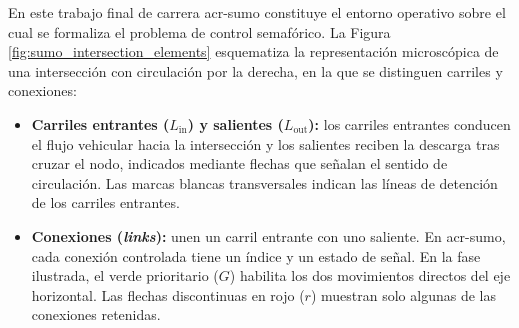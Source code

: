 En este trabajo final de carrera \acrshort{acr-sumo} constituye el entorno operativo sobre el cual se formaliza el problema de control semafórico. La Figura \ref{fig:sumo_intersection_elements} esquematiza la representación microscópica de una intersección con circulación por la derecha, en la que se distinguen carriles y conexiones:
\begin{itemize}
    \item \textbf{Carriles entrantes ($L_{\text{in}}$) y salientes ($L_{\text{out}}$):} los carriles entrantes conducen el flujo vehicular hacia la intersección y los salientes reciben la descarga tras cruzar el nodo, indicados mediante flechas que señalan el sentido de circulación. Las marcas blancas transversales indican las líneas de detención de los carriles entrantes.
    \item \textbf{Conexiones (\textit{links}):} unen un carril entrante con uno saliente. En \acrshort{acr-sumo}, cada conexión controlada tiene un índice y un estado de señal. En la fase ilustrada, el verde prioritario ($G$) habilita los dos movimientos directos del eje horizontal. Las flechas discontinuas en rojo ($r$) muestran solo algunas de las conexiones retenidas.
\end{itemize}

